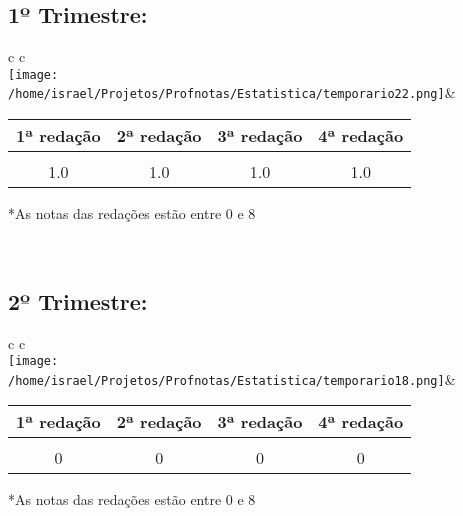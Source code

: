 \documentclass{article}%
\begin{document}
\subsection*{1º Trimestre:}%
\label{subsec:1Trimestre}%
\begin{tabular}{c c}%
\\%
\texttt{[image: /home/israel/Projetos/Profnotas/Estatistica/temporario22.png]}&\begin{minipage}[b]{0.49\textwidth}%
\begin{tabular}[b]{c | c | c | c}%
\textbf{1ª redação}&\textbf{2ª redação}&\textbf{3ª redação}&\textbf{4ª redação}\\%
\hline%
&&&\\%
1.0&1.0&1.0&1.0\\%
\end{tabular}%
\newline%
\newline%
*As notas das redações estão entre 0 e 8%
\newline%
\newline%
\newline%
\end{minipage}\\%
\end{tabular}

%
\subsection*{2º Trimestre:}%
\label{subsec:2Trimestre}%
\begin{tabular}{c c}%
\\%
\texttt{[image: /home/israel/Projetos/Profnotas/Estatistica/temporario18.png]}&\begin{minipage}[b]{0.49\textwidth}%
\begin{tabular}[b]{c | c | c | c}%
\textbf{1ª redação}&\textbf{2ª redação}&\textbf{3ª redação}&\textbf{4ª redação}\\%
\hline%
&&&\\%
0&0&0&0\\%
\end{tabular}%
\newline%
\newline%
*As notas das redações estão entre 0 e 8%
\newline%
\newline%
\newline%
\end{minipage}\\%
\end{tabular}
\end{document}
